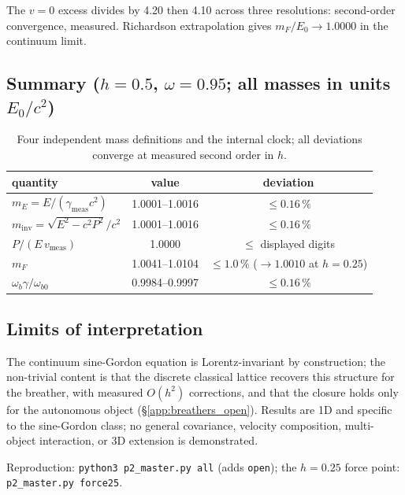 \documentclass[11pt,a4paper]{article}
\theoremstyle{plain}
\theoremstyle{remark}
\begin{document}
The $v = 0$ excess divides by 4.20 then 4.10 across three resolutions: second-order convergence, measured. Richardson extrapolation gives $m_F/E_0 \to 1.0000$ in the continuum limit.

\subsection{Summary ($h = 0.5$, $\omega = 0.95$; all masses in units $E_0/c^2$)}

\begin{table}[htbp]
\centering\small
\begin{tabular}{lcc}
\toprule
quantity & value & deviation \\
\midrule
$m_E = E/(\gamma_{\text{meas}} c^2)$ & 1.0001--1.0016 & $\le 0.16\,\%$ \\
$m_{\text{inv}} = \sqrt{E^2 - c^2P^2}/c^2$ & 1.0001--1.0016 & $\le 0.16\,\%$ \\
$P/(E\,v_{\text{meas}})$ & 1.0000 & $\le$ displayed digits \\
$m_F$ & 1.0041--1.0104 & $\le 1.0\,\%$ ($\to 1.0010$ at $h = 0.25$) \\
$\omega_b\gamma/\omega_{b0}$ & 0.9984--0.9997 & $\le 0.16\,\%$ \\
\bottomrule
\end{tabular}
\caption{Four independent mass definitions and the internal clock; all deviations converge at measured second order in $h$.}
\label{tab:breather_summary}
\end{table}

\subsection{Limits of interpretation}
The continuum sine-Gordon equation is Lorentz-invariant by construction; the non-trivial content is that the discrete classical lattice recovers this structure for the breather, with measured $O(h^2)$ corrections, and that the closure holds only for the autonomous object (\S\ref{app:breathers_open}). Results are 1D and specific to the sine-Gordon class; no general covariance, velocity composition, multi-object interaction, or 3D extension is demonstrated.

Reproduction: \texttt{python3 p2\_master.py all} (adds \texttt{open}); the $h = 0.25$ force point: \texttt{p2\_master.py force25}.
\end{document}
